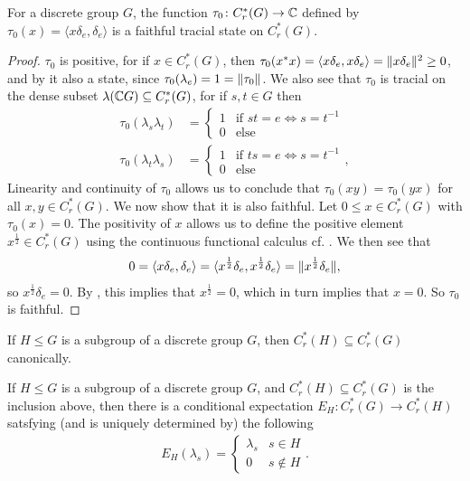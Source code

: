 \begin{proposition}
For a discrete group $G$, the function $\tau_0 \colon C_r^*(G) \to \mathbb{C}$ defined by $\tau_0(x)=\langle x \delta_e,\delta_e\rangle$ is a faithful tracial state on $C_r^*(G)$. 
\begin{proof}
$\tau_0$ is positive, for if $x \in C_r^*(G)$, then $\tau_0(x^*x)=\langle x \delta_e, x \delta_e\rangle= \lVert x \delta_e \rVert^2 \geq 0$, and by \cite[Corollary 13.6][80]{zhu} it also a state, since $\tau_0(\lambda_e)=1= \lVert \tau_0 \rVert$. We also see that $\tau_0$ is tracial on the dense subset $\lambda(\mathbb{C} G) \subseteq C_r^*(G)$, for if $s,t \in G$ then
\begin{align*}
\tau_0(\lambda_s \lambda_t) &= \begin{cases}
1 & \text{if } st=e \iff s=t^{-1}\\
0 & \text{else}
\end{cases}\\
\tau_0(\lambda_t \lambda_s) &=\begin{cases}
1 & \text{if } ts=e \iff s=t^{-1}\\
0 & \text{else}
\end{cases},
\end{align*}
Linearity and continuity of $\tau_0$ allows us to conclude that $\tau_0(xy)=\tau_0(yx)$ for all $x,y \in C_r^*(G)$. We now show that it is also faithful. Let $0 \leq x \in C_r^*(G)$ with $\tau_0 (x)=0$. The positivity of $x$ allows us to define the positive element $x^{\frac{1}{2}} \in C_r^*(G)$ using the continuous functional calculus cf. \cite[Theorem 10.3][62]{zhu}. We then see that
\begin{align*}
0=\langle x \delta_e ,\delta_e\rangle=\langle x^{\frac{1}{2}} \delta_e, x^{\frac{1}{2}} \delta_e \rangle= \lVert x^{\frac{1}{2}} \delta_e\rVert,
\end{align*} 
so $x^{\frac12}\delta_e=0$. By , this implies that $x^{\frac12}=0$, which in turn implies that $x=0$. So $\tau_0$ is faithful.
\end{proof}
\end{proposition}

\begin{proposition}
If $H \leq G$ is a subgroup of a discrete group $G$, then $C_r^*(H) \subseteq C_r^*(G)$ canonically. 
\end{proposition}

\begin{proposition}
If $H \leq G$ is a subgroup of a discrete group $G$, and $C_r^*(H) \subseteq C_r^*(G)$ is the inclusion above, then there is a conditional expectation $E_H \colon C_r^*(G) \to C_r^*(H)$ satsfying (and is uniquely determined by) the following
\begin{align*}
E_H(\lambda_s)=\begin{cases}
\lambda_s & s \in H\\
0 & s \not\in H
\end{cases}.
\end{align*}
\end{proposition}

